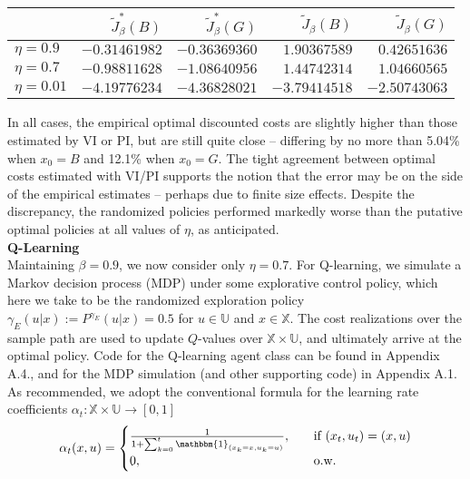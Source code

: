 \documentclass[10pt]{article}
\newcommand{\mbb}[1]{\mathbb{#1}}
\newcommand{\1}[1]{\mathbbm{1}_{#1}}
\begin{document}
    \begin{center}
        \begin{tabular}{@{}l|rrrr@{}}\toprule
                & $\tilde{J}^\ast_\beta(B)$ & $\tilde{J}^\ast_\beta(G)$ & $\tilde{J}_\beta(B)$ & $\tilde{J}_{\beta}(G)$ \\\midrule
            $\eta=0.9$ & $-0.31461982$ & $-0.36369360$ & $1.90367589$ & $0.42651636$\\ 
            $\eta=0.7$ & $-0.98811628$ & $-1.08640956$ & $1.44742314$ & $1.04660565$ \\
            $\eta=0.01$ & $-4.19776234$ & $-4.36828021$ & $-3.79414518$ & $-2.50743063$\\
            \bottomrule
        \end{tabular}
    \end{center}
    In all cases, the empirical optimal discounted costs are slightly higher than those estimated by VI or PI, but are still quite close -- differing by no more than 5.04\% when $x_0=B$ and 12.1\% when $x_0=G$. The tight agreement between optimal costs estimated with VI/PI supports the notion that the error may be on the side of the empirical estimates -- perhaps due to finite size effects. Despite the discrepancy, the randomized policies performed markedly worse than the putative optimal policies at all values of $\eta$, as anticipated.\\[5pt]
    {\bf Q-Learning}\\[5pt]
    Maintaining $\beta=0.9$, we now consider only $\eta=0.7$. For Q-learning, we simulate a Markov decision process (MDP) under some explorative control policy, which here we take to be the randomized exploration policy $\gamma_E(u|x):=P^{\gamma_E}(u|x)=0.5$ for $u\in\mbb{U}$ and $x\in\mbb{X}$. The cost realizations over the sample path
    are used to update $Q$-values over $\mbb{X}\times\mbb{U}$, and ultimately arrive at the optimal policy. Code for the Q-learning agent class can be found in Appendix A.4., and for the MDP simulation (and other supporting code) in Appendix A.1.\\[5pt]
    As recommended, we adopt the conventional formula for the learning rate coefficients $\alpha_t:\mbb{X}\times\mbb{U}\rightarrow[0,1]$
    \begin{align*}
        \alpha_t(x, u)=\begin{cases}
            \frac{1}{1+\sum_{k=0}^t\1{(x_k=x,u_k=u)}},\quad&\text{if $(x_t,u_t)=(x,u)$}\\
            0,\quad&\text{o.w.}
        \end{cases}
    \end{align*}
\end{document}
